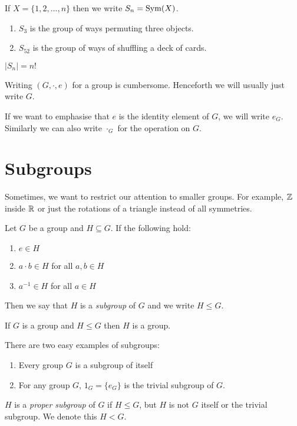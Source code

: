\documentclass[../main.tex]{subfiles}
\begin{document}
\begin{definition}
  If $X = \{1, 2, \ldots, n\}$ then we write $S_n = \operatorname{Sym}(X)$.
\end{definition}
\begin{example}
  \begin{enumerate}
    \item $S_3$ is the group of ways permuting three objects.
    \item $S_{52}$ is the group of ways of shuffling a deck of cards.
  \end{enumerate}
\end{example}
\begin{remark}
  $|S_n| = n!$
\end{remark}
\begin{remark}[Notation]
  Writing  $(G, \cdot, e)$ for a group is cumbersome.
  Henceforth we will usually just write $G$.

  If we want to emphasise that $e$ is the identity element of $G$, we will write $e_G$.
  Similarly we can also write $\cdot_G$ for the operation on $G$.
\end{remark}

\section{Subgroups}
Sometimes, we want to restrict our attention to smaller groups. For example, $\mathbb{Z}$ inside $\mathbb{R}$ or just the rotations of a triangle instead of all symmetries.
\begin{definition}[Subgroup]
  Let $G$ be a group and $H \subseteq G$. If the following hold:
  \begin{enumerate}
    \item $e \in H$
    \item $a \cdot b \in H$ for all $a, b \in H$
    \item $a^{-1} \in H$ for all $a \in H$
  \end{enumerate}
  Then we say that $H$ is a \textit{subgroup} of $G$ and we write $H \leq G$.
\end{definition}
\begin{remark}
  If $G$ is a group and $H \leq G$ then $H$ is a group.
\end{remark}
\begin{example}
  There are two easy examples of subgroups:
  \begin{enumerate}
    \item Every group $G$ is a subgroup of itself
    \item For any group $G$, $1_G = \{e_G\}$ is the trivial subgroup of $G$.
  \end{enumerate}
\end{example}
\begin{definition}
  $H$ is a \textit{proper subgroup} of $G$ if $H \leq G$, but $H$ is not $G$ itself or the trivial subgroup.
  We denote this $H < G$.
\end{definition}
\end{document}
